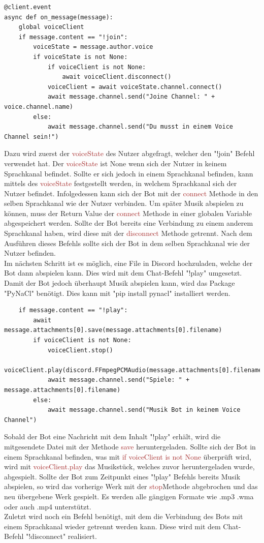 \documentclass[sigplan,screen]{acmart}
\begin{document}
\begin{lstlisting}
@client.event
async def on_message(message):
    global voiceClient
    if message.content == "!join":
        voiceState = message.author.voice
        if voiceState is not None:
            if voiceClient is not None:
                await voiceClient.disconnect()
            voiceClient = await voiceState.channel.connect()
            await message.channel.send("Joine Channel: " + voice.channel.name)
        else:
            await message.channel.send("Du musst in einem Voice Channel sein!")
\end{lstlisting} 
\noindent Dazu wird zuerst der \textcolor{brown}{voiceState} des Nutzer abgefragt, welcher den "!join" Befehl verwendet hat. Der \textcolor{brown}{voiceState} ist None wenn sich der Nutzer in keinem Sprachkanal befindet. Sollte er sich jedoch in einem Sprachkanal befinden, kann mittels des \textcolor{brown}{voiceState} festgestellt werden, in welchem Sprachkanal sich der Nutzer befindet. Infolgedessen kann sich der Bot mit der \textcolor{brown}{connect} Methode in den selben Sprachkanal wie der Nutzer verbinden. Um später Musik abspielen zu können, muss der Return Value der \textcolor{brown}{connect} Methode in einer globalen Variable abgespeichert werden. Sollte der Bot bereits eine Verbindung zu einem anderem Sprachkanal haben, wird diese mit der \textcolor{brown}{disconnect} Methode getrennt. Nach dem Ausführen dieses Befehls sollte sich der Bot in dem selben Sprachkanal wie der Nutzer befinden. \\
\noindent Im nächsten Schritt ist es möglich, eine File in Discord hochzuladen, welche der Bot dann abspielen kann. Dies wird mit dem Chat-Befehl "!play" umgesetzt. Damit der Bot jedoch überhaupt Musik abspielen kann, wird das Package "PyNaCl" benötigt. Dies kann mit "pip install pynacl" installiert werden. 

\begin{lstlisting}
    if message.content == "!play":
        await message.attachments[0].save(message.attachments[0].filename)
        if voiceClient is not None:
            voiceClient.stop()
            voiceClient.play(discord.FFmpegPCMAudio(message.attachments[0].filename))
            await message.channel.send("Spiele: " + message.attachments[0].filename)
        else:
            await message.channel.send("Musik Bot in keinem Voice Channel")
\end{lstlisting} 
Sobald der Bot eine Nachricht mit dem Inhalt "!play" erhält, wird die mitgesendete Datei mit der Methode \textcolor{brown}{save} heruntergeladen. Sollte sich der Bot in einem Sprachkanal befinden, was mit \textcolor{brown}{if voiceClient is not None} überprüft wird, wird mit \textcolor{brown}{voiceClient.play} das Musikstück, welches zuvor heruntergeladen wurde, abgespielt. Sollte der Bot zum Zeitpunkt eines "!play" Befehls bereits Musik abspielen, so wird das vorherige Werk mit der \textcolor{brown}{stop}Methode abgebrochen und das neu übergebene Werk gespielt. Es werden alle gängigen Formate wie .mp3 .wma oder auch .mp4 unterstützt.  \\
\noindent Zuletzt wird noch ein Befehl benötigt, mit dem die Verbindung des Bots mit einem Sprachkanal wieder getrennt werden kann. Diese wird mit dem Chat-Befehl "!disconnect" realisiert.
\end{document}
